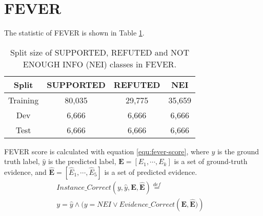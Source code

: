 \documentclass[11pt,a4paper]{article}
\begin{document}
\section{FEVER}
\label{appendix:data-statistic}
The statistic of FEVER is shown in Table \ref{table:dataset-detail}. 
\begin{table}[h]\small
	\centering
	\begin{tabular}{c|ccc}
		\hline
		\textbf{Split} & SUPPORTED & REFUTED & NEI    \\ \hline
		Training       & 80,035    & 29,775  & 35,659 \\
		Dev            & 6,666     & 6,666   & 6,666  \\
		Test           & 6,666     & 6,666   & 6,666  \\ \hline
	\end{tabular}
	\caption{Split size of SUPPORTED, REFUTED and NOT ENOUGH INFO (NEI) classes in FEVER.}
	\label{table:dataset-detail}
\end{table}


FEVER score is calculated with equation \ref{equ:fever-score}, where 
$y$ is the ground truth label, $\hat{y}$ is the predicted label, 
$\bm{E}=[E_1,\cdots,E_k]$ is a set of ground-truth evidence,  and $\bm{\hat{E}}=[\hat{E}_1,\cdots,\hat{E}_5]$ is a set of predicted evidence.
\begin{equation}
\begin{aligned}
Instance\_Correct(y,\hat{y},\bm{E},\bm{\hat{E}}) \overset{def} {=} &\\y= \hat{y}\wedge(y=NEI\vee Evidence\_Correct(\bm{E},\bm{\hat{E})})
\end{aligned}
\label{equ:fever-score}
\end{equation}
\end{document}
